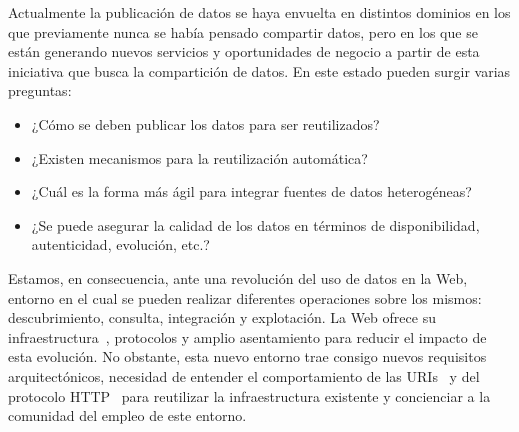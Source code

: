 Actualmente la publicación de datos se haya envuelta en distintos dominios en los que previamente
nunca se había pensado compartir datos, pero en los que se están generando nuevos servicios y 
oportunidades de negocio a partir de esta iniciativa que busca la compartición de datos. En 
este estado pueden surgir varias preguntas:
\begin{itemize}
 \item ¿Cómo se deben publicar los datos para ser reutilizados?
\item ¿Existen mecanismos para la reutilización automática?
\item ¿Cuál es la forma más ágil para integrar fuentes de datos heterogéneas?
\item ¿Se puede asegurar la calidad de los datos en términos de disponibilidad, autenticidad, evolución, etc.?
\end{itemize}

Estamos, en consecuencia, ante una revolución del uso de datos en la Web, entorno en el cual se pueden realizar
diferentes operaciones sobre los mismos: descubrimiento, consulta, integración y explotación. La Web ofrece
su infraestructura~\cite{webarch}, protocolos y amplio asentamiento para reducir el impacto de esta evolución. No obstante, esta nuevo 
entorno trae consigo nuevos requisitos arquitectónicos, necesidad de entender el comportamiento de las \gls{URI}s~\cite{uri-rfc} y del 
protocolo \gls{HTTP}~\cite{http-rfc} para reutilizar la infraestructura existente y concienciar a la comunidad del empleo de este entorno. 


